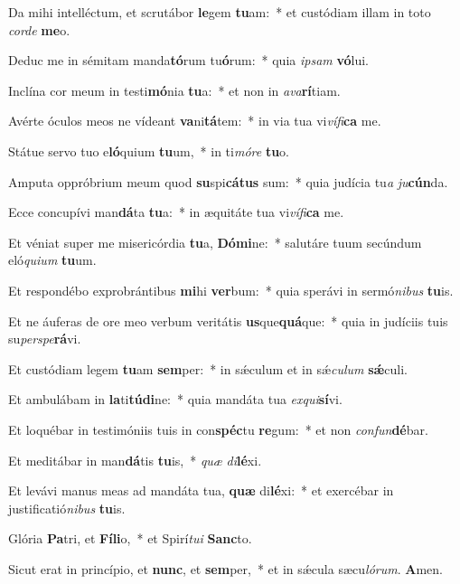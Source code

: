﻿\item Da mihi intelléctum, et scrutábor \textbf{le}gem \textbf{tu}am:~* et custódiam illam in toto \emph{cor}\emph{de} \textbf{me}o.
\item Deduc me in sémitam manda\textbf{tó}rum tu\textbf{ó}rum:~* quia \emph{ip}\emph{sam} \textbf{vó}lui.
\item Inclína cor meum in testi\textbf{mó}nia \textbf{tu}a:~* et non in \emph{a}\emph{va}\textbf{rí}tiam.
\item Avérte óculos meos ne vídeant \textbf{va}ni\textbf{tá}tem:~* in via tua vi\emph{ví}\emph{fi}\textbf{ca} me.
\item Státue servo tuo e\textbf{ló}quium \textbf{tu}um,~* in ti\emph{mó}\emph{re} \textbf{tu}o.
\item Amputa oppróbrium meum quod \textbf{su}spi\textbf{cá}\textbf{tus} sum:~* quia judícia tu\emph{a} \emph{ju}\textbf{cún}da.
\item Ecce concupívi man\textbf{dá}ta \textbf{tu}a:~* in æquitáte tua vi\emph{ví}\emph{fi}\textbf{ca} me.
\item Et véniat super me misericórdia \textbf{tu}a, \textbf{Dó}\textbf{mi}ne:~* salutáre tuum secúndum eló\emph{qui}\emph{um} \textbf{tu}um.
\item Et respondébo exprobrántibus \textbf{mi}hi \textbf{ver}bum:~* quia sperávi in sermó\emph{ni}\emph{bus} \textbf{tu}is.
\item Et ne áuferas de ore meo verbum veritátis \textbf{us}que\textbf{quá}que:~* quia in judíciis tuis su\emph{per}\emph{spe}\textbf{rá}vi.
\item Et custódiam legem \textbf{tu}am \textbf{sem}per:~* in sǽculum et in sǽ\emph{cu}\emph{lum} \textbf{sǽ}culi.
\item Et ambulábam in \textbf{la}ti\textbf{tú}\textbf{di}ne:~* quia mandáta tua \emph{ex}\emph{qui}\textbf{sí}vi.
\item Et loquébar in testimóniis tuis in con\textbf{spéc}tu \textbf{re}gum:~* et non \emph{con}\emph{fun}\textbf{dé}bar.
\item Et meditábar in man\textbf{dá}tis \textbf{tu}is,~* \emph{quæ} \emph{di}\textbf{lé}xi.
\item Et levávi manus meas ad mandáta tua, \textbf{quæ} di\textbf{lé}xi:~* et exercébar in justificatió\emph{ni}\emph{bus} \textbf{tu}is.
\item Glória \textbf{Pa}tri, et \textbf{Fí}\textbf{li}o,~* et Spirí\emph{tu}\emph{i} \textbf{Sanc}to.
\item Sicut erat in princípio, et \textbf{nunc}, et \textbf{sem}per,~* et in sǽcula sæcu\emph{ló}\emph{rum}. \textbf{A}men.